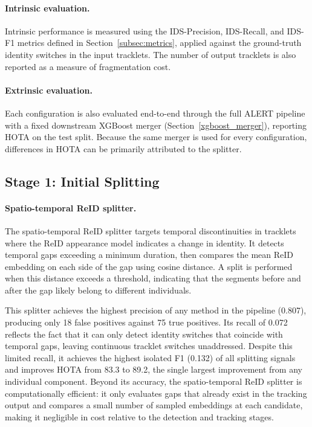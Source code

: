 \paragraph{Intrinsic evaluation.}
Intrinsic performance is measured using the IDS-Precision, IDS-Recall, and IDS-F1 metrics defined in Section~\ref{subsec:metrics}, applied against the ground-truth identity switches in the input tracklets. The number of output tracklets is also reported as a measure of fragmentation cost.

\paragraph{Extrinsic evaluation.}
Each configuration is also evaluated end-to-end through the full ALERT pipeline with a fixed downstream XGBoost merger (Section~\ref{xgboost_merger}), reporting HOTA on the test split. Because the same merger is used for every configuration, differences in HOTA can be primarily attributed to the splitter.

\subsection{Stage 1: Initial Splitting}\label{subsec:stage1_splitting}

\paragraph{Spatio-temporal ReID splitter.}
The spatio-temporal ReID splitter targets temporal discontinuities in tracklets where the ReID appearance model indicates a change in identity. It detects temporal gaps exceeding a minimum duration, then compares the mean ReID embedding on each side of the gap using cosine distance. A split is performed when this distance exceeds a threshold, indicating that the segments before and after the gap likely belong to different individuals.

This splitter achieves the highest precision of any method in the pipeline (0.807), producing only 18 false positives against 75 true positives. Its recall of 0.072 reflects the fact that it can only detect identity switches that coincide with temporal gaps, leaving continuous tracklet switches unaddressed. Despite this limited recall, it achieves the highest isolated F1 (0.132) of all splitting signals and improves HOTA from 83.3 to 89.2, the single largest improvement from any individual component. Beyond its accuracy, the spatio-temporal ReID splitter is computationally efficient: it only evaluates gaps that already exist in the tracking output and compares a small number of sampled embeddings at each candidate, making it negligible in cost relative to the detection and tracking stages.

